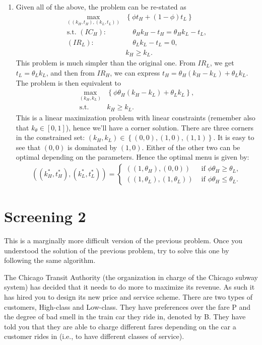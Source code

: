 \documentclass[a4paper]{article}
\begin{document}
\begin{enumerate}
\begin{enumerate}
		\item Given all of the above, the problem can be re-stated as 
		\begin{align*}
			\max_{((k_H,t_H),(k_L,t_L))} & \left\{ \phi t_H + (1-\phi) t_L \right\}
			\\ \text{s.t. } (IC_H):&\quad \theta_H k_H - t_H = \theta_H k_L - t_L,
			\\ (IR_L):&\quad \theta_L k_L - t_L = 0,
			\\ & k_H \geq k_L.
		\end{align*}
		This problem is much simpler than the original one. From $IR_L$, we get $t_L = \theta_L k_L$, and then from $IR_H$, we can express $t_H = \theta_H (k_H-k_L) + \theta_L k_L$. The problem is then equivalent to
		\begin{align*}
			\max_{(k_H,k_L)} & \left\{ \phi \theta_H (k_H-k_L) + \theta_L k_L \right\},
			\\\text{s.t. } & k_H \geq k_L.
		\end{align*}
		This is a linear maximization problem with linear constraints (remember also that $k_\theta \in [0,1]$), hence we'll have a corner solution. There are three corners in the constrained set: $(k_H,k_L) \in \left\{ (0,0), (1,0), (1,1) \right\}$. It is easy to see that $(0,0)$ is dominated by $(1,0)$. Either of the other two can be optimal depending on the parameters. Hence the optimal menu is given by:
		\begin{align*}
			((k_H^*,t_H^*), (k_L^*,t_L^*)) = \begin{cases}
				((1,\theta_H),(0,0)) & \text{ if } \phi \theta_H \geq \theta_L,
				\\
				((1,\theta_L), (1,\theta_L)) & \text{ if } \phi \theta_H \leq \theta_L.
			\end{cases}
		\end{align*}
	\end{enumerate}
\end{enumerate}

\fi 



\section{Screening 2}

This is a marginally more difficult version of the previous problem. Once you understood the solution of the previous problem, try to solve this one by following the same algorithm.

The Chicago Transit Authority (the organization in charge of the Chicago 
subway system) has decided that it needs to do more to maximize
its revenue. As such it has hired you to design its new price and service
scheme. There are two types of customers, High-class and Low-class. They
have preferences over the fare P and the degree of bad smell in the train
car they ride in, denoted by B. They have told you that they are able to
charge different fares depending on the car a customer rides in (i.e., to
have different classes of service).
\end{document}
